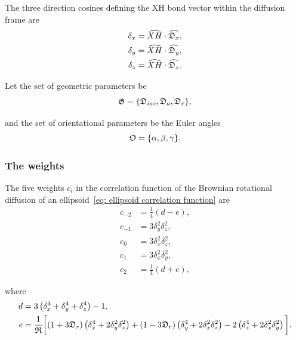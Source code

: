 The three direction cosines defining the XH bond vector within the diffusion frame are
\begin{subequations}
\begin{align}
    \delta_x &= \widehat{XH} \cdot \widehat{\mathfrak{D}_x}, \\
    \delta_y &= \widehat{XH} \cdot \widehat{\mathfrak{D}_y}, \\
    \delta_z &= \widehat{XH} \cdot \widehat{\mathfrak{D}_z}.
\end{align}
\end{subequations}

\noindent Let the set of geometric parameters be
\begin{equation}
    \mathfrak{G} = \{\mathfrak{D}_{iso}, \mathfrak{D}_a, \mathfrak{D}_r\},
\end{equation}

\noindent and the set of orientational parameters be the Euler angles
\begin{equation}
    \mathfrak{O} = \{\alpha, \beta, \gamma\}.
\end{equation}



\subsubsection{The weights}

The five weights $c_i$ in the correlation function of the Brownian rotational diffusion of an ellipsoid~\eqref{eq: ellipsoid correlation function} are
\begin{subequations}
\begin{align}
 c_{-2} &= \tfrac{1}{4}(d - e),     \\
 c_{-1} &= 3\delta_y^2\delta_z^2,   \\
 c_{0}  &= 3\delta_x^2\delta_z^2,   \\
 c_{1}  &= 3\delta_x^2\delta_y^2,   \\
 c_{2}  &= \tfrac{1}{4}(d + e),
\end{align}
\end{subequations}

\noindent where
\begin{align}
 d &= 3 \left( \delta_x^4 + \delta_y^4 + \delta_z^4 \right) - 1, \\
 e &= \frac{1}{\mathfrak{R}} \bigg[ (1 + 3\mathfrak{D}_r) \left(\delta_x^4 + 2\delta_y^2\delta_z^2\right)
   + (1 - 3\mathfrak{D}_r) \left(\delta_y^4 + 2\delta_x^2\delta_z^2\right) - 2 \left(\delta_z^4 + 2\delta_x^2\delta_y^2\right) \bigg].
\end{align}

